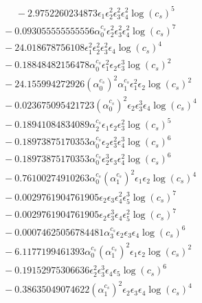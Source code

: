 \documentclass[10pt]{article}
\begin{document}
\begin{align*}
\phantom{F_{s,7}} &\phantom{={}}{}  - 2.9752260234873 \epsilon_{1} \epsilon_{2}^{2} \epsilon_{3}^{2} \epsilon_{4}^{2} \log{\left(c_{s} \right)}^{5} \\
&{}  - 0.093055555555556 \alpha_{0}^{c_s} \epsilon_{2}^{2} \epsilon_{3}^{2} \epsilon_{4}^{2} \log{\left(c_{s} \right)}^{7} \\
&{}  - 24.018678756108 \epsilon_{1}^{2} \epsilon_{2}^{2} \epsilon_{3}^{2} \epsilon_{4} \log{\left(c_{s} \right)}^{4} \\
&{}  - 0.18848482156478 \alpha_{0}^{c_s} \epsilon_{1}^{2} \epsilon_{2} \epsilon_{3}^{3} \log{\left(c_{s} \right)}^{2} \\
&{}  - 24.155994272926 \left(\alpha_{0}^{c_s}\right)^{2} \alpha_{1}^{c_s} \epsilon_{1}^{2} \epsilon_{2} \log{\left(c_{s} \right)}^{2} \\
&{}  - 0.023675095421723 \left(\alpha_{0}^{c_s}\right)^{2} \epsilon_{2} \epsilon_{3}^{3} \epsilon_{4} \log{\left(c_{s} \right)}^{4} \\
&{}  - 0.18941084834089 \alpha_{2}^{c_s} \epsilon_{1} \epsilon_{2} \epsilon_{3}^{2} \log{\left(c_{s} \right)}^{5} \\
&{}  - 0.18973875170353 \alpha_{0}^{c_s} \epsilon_{2} \epsilon_{3}^{2} \epsilon_{4}^{3} \log{\left(c_{s} \right)}^{6} \\
&{}  - 0.18973875170353 \alpha_{0}^{c_s} \epsilon_{2}^{3} \epsilon_{3} \epsilon_{4}^{2} \log{\left(c_{s} \right)}^{6} \\
&{}  - 0.76100274910263 \alpha_{0}^{c_s} \left(\alpha_{1}^{c_s}\right)^{2} \epsilon_{1} \epsilon_{2} \log{\left(c_{s} \right)}^{4} \\
&{}  - 0.0029761904761905 \epsilon_{2} \epsilon_{3} \epsilon_{4}^{2} \epsilon_{5}^{3} \log{\left(c_{s} \right)}^{7} \\
&{}  - 0.0029761904761905 \epsilon_{2} \epsilon_{3}^{3} \epsilon_{4} \epsilon_{5}^{2} \log{\left(c_{s} \right)}^{7} \\
&{}  - 0.00074625056784481 \alpha_{3}^{c_s} \epsilon_{2} \epsilon_{3} \epsilon_{4} \log{\left(c_{s} \right)}^{6} \\
&{}  - 6.1177199461393 \alpha_{0}^{c_s} \left(\alpha_{1}^{c_s}\right)^{2} \epsilon_{1} \epsilon_{2} \log{\left(c_{s} \right)}^{2} \\
&{}  - 0.19152975306636 \epsilon_{2}^{2} \epsilon_{3}^{3} \epsilon_{4} \epsilon_{5} \log{\left(c_{s} \right)}^{6} \\
&{}  - 0.38635049074622 \left(\alpha_{1}^{c_s}\right)^{2} \epsilon_{2} \epsilon_{3} \epsilon_{4} \log{\left(c_{s} \right)}^{4} \\

\end{align*}
\end{document}

